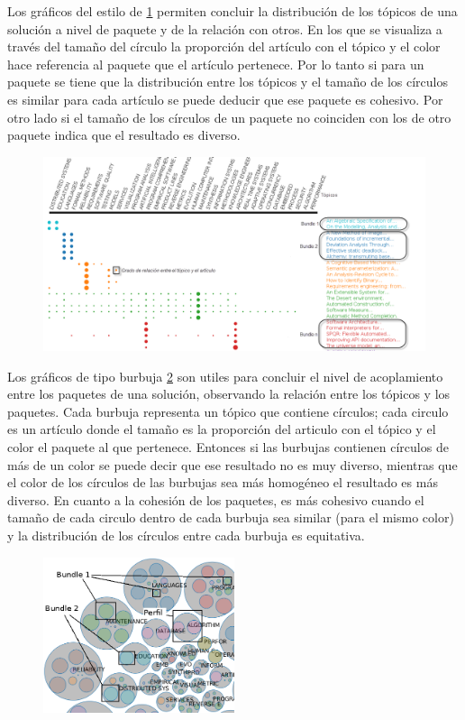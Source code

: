 Los gráficos del estilo de \ref{res:img-explain-bars} permiten concluir la distribución de los tópicos de una solución a nivel de paquete y de la relación con otros. En los que se visualiza a través del tamaño del círculo la proporción del artículo con el tópico y el color hace referencia al paquete que el artículo pertenece. Por lo tanto si para un paquete se tiene que la distribución entre los tópicos y el tamaño de los círculos es similar para cada artículo se puede deducir que ese paquete es cohesivo. Por otro lado si el tamaño de los círculos de un paquete no coinciden con los de otro paquete indica que el resultado es diverso.
\begin{figure}[H]
  \centering
    \includegraphics[width=1\textwidth]{img/explain-bars.png}
  \caption{}
  \label{res:img-explain-bars}
\end{figure}

Los gráficos de tipo burbuja \ref{res:img-explain-bubbles} son utiles para concluir el nivel de acoplamiento entre los paquetes de una solución, observando la relación entre los tópicos y los paquetes. Cada burbuja representa un tópico que contiene círculos; cada circulo es un artículo donde el tamaño es la proporción del articulo con el tópico y el color el paquete al que pertenece. Entonces si las burbujas contienen círculos de más de un color se puede decir que ese resultado no es muy diverso, mientras que el color de los círculos de las burbujas sea más homogéneo el resultado es más diverso. En cuanto a la cohesión de los paquetes, es más cohesivo cuando el tamaño de cada circulo dentro de cada burbuja sea similar (para el mismo color) y la distribución de los círculos entre cada burbuja es equitativa.

\begin{figure}[H]
  \centering
    \includegraphics[width=0.5\textwidth]{img/explain-bubbles.png}
  \caption{}
  \label{res:img-explain-bubbles}
\end{figure}



